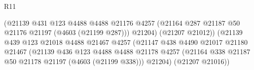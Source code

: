 \begin{lexlean}{R11}
\begin{coremodule}
                                                (@21139
                                                  @431
                                                  @123
                                                  @4488
                                                  @4488
                                                  @21176
                                                  @4257
                                                  (@21164
                                                    @287
                                                    @21187
                                                    @50
                                                    @21176
                                                    @21197
                                                    (@4603 (@21199 @287)))
                                                  @21204)
                                                (@21207 @21012))
                                              (@21139
                                                @439
                                                @123
                                                @21018
                                                @4488
                                                @21467
                                                @4257
                                                (@21147
                                                  @438
                                                  @4490
                                                  @21017
                                                  @21180
                                                  @21467
                                                  (@21139
                                                    @436
                                                    @123
                                                    @4488
                                                    @4488
                                                    @21178
                                                    @4257
                                                    (@21164
                                                      @338
                                                      @21187
                                                      @50
                                                      @21178
                                                      @21197
                                                      (@4603 (@21199 @338)))
                                                    @21204)
                                                  (@21207 @21016))

\end{coremodule}
\end{lexlean}
